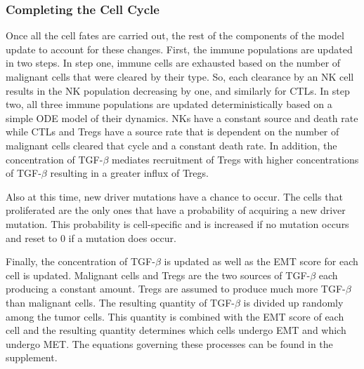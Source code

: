 \documentclass[11pt]{article}
\begin{document}
\subsubsection{Completing the Cell Cycle}
Once all the cell fates are carried out, the rest of the components of the model update to account for these changes.
First, the immune populations are updated in two steps.
In step one, immune cells are exhausted based on the number of malignant cells that were cleared by their type.
So, each clearance by an NK cell results in the NK population decreasing by one, and similarly for CTLs.
In step two, all three immune populations are updated deterministically based on a simple ODE model of their dynamics.
NKs have a constant source and death rate while CTLs and Tregs have a source rate that is dependent on the number of malignant cells cleared that cycle and a constant death rate.
In addition, the concentration of TGF-$\beta$ mediates recruitment of Tregs with higher concentrations of TGF-$\beta$ resulting in a greater influx of Tregs.
\par
Also at this time, new driver mutations have a chance to occur.
The cells that proliferated are the only ones that have a probability of acquiring a new driver mutation.
This probability is cell-specific and is increased if no mutation occurs and reset to 0 if a mutation does occur.
\par
Finally, the concentration of TGF-$\beta$ is updated as well as the EMT score for each cell is updated.
Malignant cells and Tregs are the two sources of TGF-$\beta$ each producing a constant amount.
Tregs are assumed to produce much more TGF-$\beta$ than malignant cells.
The resulting quantity of TGF-$\beta$ is divided up randomly among the tumor cells.
This quantity is combined with the EMT score of each cell and the resulting quantity determines which cells undergo EMT and which undergo MET.
The equations governing these processes can be found in the supplement.
\end{document}
